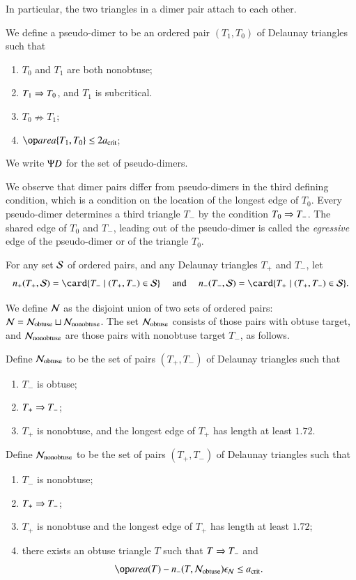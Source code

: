 In particular, the two triangles in a dimer pair attach to each other.

\begin{definition}
  We define a pseudo-dimer to be an ordered pair $(T_1,T_0)$ of
  Delaunay triangles such that
\begin{enumerate}
\item $T_0$ and $T_1$ are both nonobtuse;
\item $T_1\Rightarrow T_0$, and  $T_1$ is subcritical.
\item $T_0 \nRightarrow T_1$;
\item $\area\{T_1,T_0\} \le 2\acrit$;
\end{enumerate}
We write $\Psi D$ for the set of pseudo-dimers.
\end{definition}

We observe that dimer pairs differ from pseudo-dimers in the third
defining condition, which is a condition on the location of the
longest edge of $T_0$.  Every pseudo-dimer determines a third triangle
$T_-$ by the condition $T_0\Rightarrow T_-$.  The shared edge of $T_0$ and
$T_-$, leading out of the pseudo-dimer is called the {\it egressive} edge of
the pseudo-dimer or of the triangle $T_0$.

For any set $\mathcal S$ of ordered pairs, and any Delaunay triangles $T_+$
and $T_-$, let
\[
n_+(T_+,\SS) = \card \{T_-\mid (T_+,T_-)\in \SS\}
\quad\text{ and }\quad
n_-(T_-,\SS)
= \card \{T_+\mid (T_+,T_-)\in \SS\}.
\]

We define $\mathcal N$ as the disjoint union of two sets of ordered pairs: $\mathcal N
= \mathcal N_{\text{obtuse}} \sqcup \mathcal N_{\text{nonobtuse}}$.  The set
$\mathcal N_{\text{obtuse}}$ consists of those pairs with obtuse target, and
$\mathcal N_{\text{nonobtuse}}$ are those pairs with nonobtuse target $T_-$,
as follows.

Define $\mathcal N_{\text{obtuse}}$ to be the set of pairs $(T_+,T_-)$ of
Delaunay triangles such that
\begin{enumerate}
\item $T_-$ is obtuse;
\item $T_+\Rightarrow T_-$;
\item $T_+$ is nonobtuse, and the longest edge of $T_+$ has length at
  least $1.72$.
\end{enumerate}

Define  $\mathcal N_{\text{nonobtuse}}$ to 
be the set of pairs $(T_+,T_-)$ of Delaunay triangles such that
\begin{enumerate}
\item $T_-$ is nonobtuse;
\item $T_+\Rightarrow T_-$;
\item $T_+$ is nonobtuse and the longest edge of $T_+$ has length at
  least $1.72$;
\item there exists an obtuse triangle $T$ such that $T\Rightarrow T_-$ and 
\[
\area(T) -   n_-(T,\N_{\text{obtuse}})\epsN\le \acrit.
\]
\end{enumerate}

